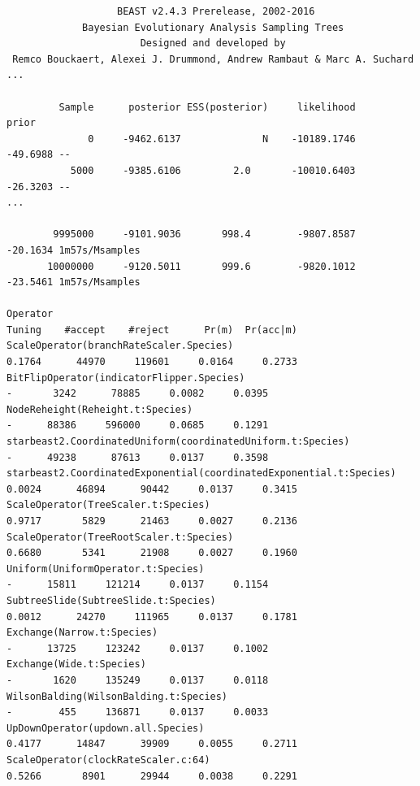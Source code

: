 \documentclass{article}
\begin{document}
{\scriptsize
\begin{verbatim}
                   BEAST v2.4.3 Prerelease, 2002-2016
             Bayesian Evolutionary Analysis Sampling Trees
                       Designed and developed by
 Remco Bouckaert, Alexei J. Drummond, Andrew Rambaut & Marc A. Suchard
...

         Sample      posterior ESS(posterior)     likelihood          prior
              0     -9462.6137              N    -10189.1746       -49.6988 --
           5000     -9385.6106         2.0       -10010.6403       -26.3203 --
...

        9995000     -9101.9036       998.4        -9807.8587       -20.1634 1m57s/Msamples
       10000000     -9120.5011       999.6        -9820.1012       -23.5461 1m57s/Msamples

Operator                                                                Tuning    #accept    #reject      Pr(m)  Pr(acc|m)
ScaleOperator(branchRateScaler.Species)                                 0.1764      44970     119601     0.0164     0.2733 
BitFlipOperator(indicatorFlipper.Species)                                    -       3242      78885     0.0082     0.0395 
NodeReheight(Reheight.t:Species)                                             -      88386     596000     0.0685     0.1291 
starbeast2.CoordinatedUniform(coordinatedUniform.t:Species)                  -      49238      87613     0.0137     0.3598 
starbeast2.CoordinatedExponential(coordinatedExponential.t:Species)     0.0024      46894      90442     0.0137     0.3415 
ScaleOperator(TreeScaler.t:Species)                                     0.9717       5829      21463     0.0027     0.2136 
ScaleOperator(TreeRootScaler.t:Species)                                 0.6680       5341      21908     0.0027     0.1960 
Uniform(UniformOperator.t:Species)                                           -      15811     121214     0.0137     0.1154 
SubtreeSlide(SubtreeSlide.t:Species)                                    0.0012      24270     111965     0.0137     0.1781 
Exchange(Narrow.t:Species)                                                   -      13725     123242     0.0137     0.1002 
Exchange(Wide.t:Species)                                                     -       1620     135249     0.0137     0.0118 
WilsonBalding(WilsonBalding.t:Species)                                       -        455     136871     0.0137     0.0033 
UpDownOperator(updown.all.Species)                                      0.4177      14847      39909     0.0055     0.2711 
ScaleOperator(clockRateScaler.c:64)                                     0.5266       8901      29944     0.0038     0.2291 

\end{verbatim}}
\end{document}
